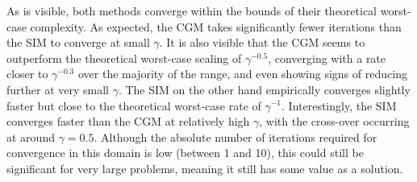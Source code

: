 As is visible, both methods converge within the bounds of their theoretical worst-case complexity. As expected, the CGM takes significantly fewer iterations than the SIM to converge at small $\gamma$. It is also visible that the CGM seems to outperform the theoretical worst-case scaling of $\gamma^{-0.5}$, converging with a rate closer to $\gamma^{-0.3}$ over the majority of the range, and even showing signs of reducing further at very small $\gamma$. The SIM on the other hand empirically converges slightly faster but close to the theoretical worst-case rate of $\gamma^{-1}$. Interestingly, the SIM converges faster than the CGM at relatively high $\gamma$, with the cross-over occurring at around $\gamma=0.5$. Although the absolute number of iterations required for convergence in this domain is low (between 1 and 10), this could still be significant for very large problems, meaning it still has some value as a solution.










